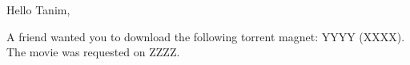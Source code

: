 \documentclass{article}
\begin{document}
Hello Tanim,

A friend wanted you to download the following torrent magnet: YYYY
(XXXX). The movie was requested on ZZZZ.
\end{document}
